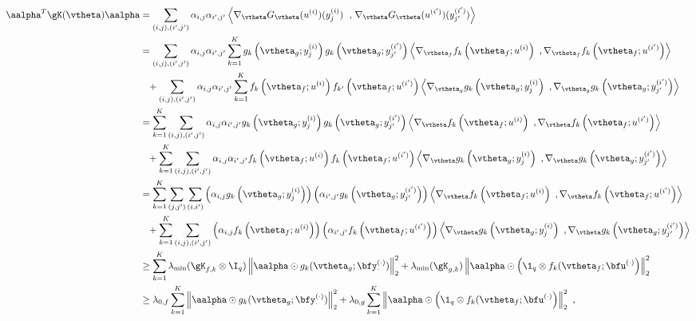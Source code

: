 \begin{align*}
\aalpha^T \gK(\vtheta) \aalpha &= \sum_{(i,j), (i',j')} \alpha_{i,j} \alpha_{i',j'} \left\langle  \nabla_{\vtheta}
G_{\vtheta}(u^{(i)})(y^{(i)}_j) \right. ~,  \left.  \nabla_{\vtheta} G_{\vtheta}(u^{(i')})(y^{(i')}_{j'})  \right\rangle \\
& = \sum_{(i,j), (i',j')} \alpha_{i,j} \alpha_{i',j'} 
\sum_{k=1}^K g_k\left(\vtheta_g; y^{(i)}_j\right) g_{k}\left(\vtheta_g; y^{(i')}_{j'} \right) \left\langle \nabla_{\vtheta_f} f_k \left(\vtheta_f; u^{(i)}\right)~,  \nabla_{\vtheta_f} f_{k} \left(\vtheta_f; u^{(i')}\right) \right\rangle \\
& \phantom{=} + \sum_{(i,j), (i',j')} \alpha_{i,j} \alpha_{i',j'} 
\sum_{k=1}^K f_k \left(\vtheta_f; u^{(i)}\right) f_{k'} \left(\vtheta_f; u^{(i')}\right) \left\langle \nabla_
{\vtheta_g} g_k\left(\vtheta_g; y^{(i)}_j\right)~, \nabla_{\vtheta_g} g_{k}\left(\vtheta_g; y^{(i')}_{j'}\right) \right\rangle \\
& = \sum_{k=1}^K \sum_{(i,j), (i',j')} \alpha_{i,j} \alpha_{i',j'} 
 g_k\left(\vtheta_g; y^{(i)}_j\right) g_{k}\left(\vtheta_g; y^{(i')}_{j'} \right) \left\langle \nabla_{\vtheta} f_k \left(\vtheta_f; u^{(i)}\right)~,  \nabla_{\vtheta} f_{k} \left(\vtheta_f; u^{(i')}\right) \right\rangle \\
& \phantom{=} + \sum_{k=1}^K  \sum_{(i,j), (i',j')} \alpha_{i,j} \alpha_{i',j'} 
f_k \left(\vtheta_f; u^{(i)}\right) f_{k} \left(\vtheta_f; u^{(i')}\right) \left\langle \nabla_{\vtheta} g_k\left(\vtheta_g; y^{(i)}_j\right)~, \nabla_{\vtheta} g_{k}\left(\vtheta_g; y^{(i')}_{j'}\right) \right\rangle \\
& = \sum_{k=1}^K   \sum_{(j,j')} \sum_{(i,i')}  \left( \alpha_{i,j} g_k\left(\vtheta_g; y^{(i)}_j\right) \right) \left( \alpha_{i',j'} g_{k}\left(\vtheta_g; y^{(i')}_{j'} \right)  \right) \left\langle   \nabla_{\vtheta} f_k \left(\vtheta_f; u^{(i)}\right)~,  \nabla_{\vtheta} f_{k} \left(\vtheta_f; u^{(i')}\right) \right\rangle \\
 & \phantom{=} + \sum_{k=1}^K \sum_{(i,j), (i',j')} \left(\alpha_{i,j} f_k \left(\vtheta_f; u^{(i)}\right)\right) \left( \alpha_{i',j'} f_{k} \left(\vtheta_f; u^{(i')}\right) \right) \left\langle  \nabla_{\vtheta} g_k\left(\vtheta_g; y^{(i)}_j\right)~,  \nabla_{\vtheta} g_{k}\left(\vtheta_g; y^{(i')}_{j'}\right) \right\rangle \\
 & \geq \sum_{k=1}^K \lambda_{\min}( \gK_{f,k} \otimes \I_q) \left\| \aalpha \odot g_k(\vtheta_g; \bfy^{(\cdot)}_{\cdot}) \right\|_2^2 + \lambda_{\min}( \gK_{g,k}) \left\| \aalpha \odot \left(\1_q \otimes f_k(\vtheta_f; \bfu^{(\cdot)} \right) \right\|_2^2 \\
 & \geq  \lambda_{0,f} \sum_{k=1}^K \left\| \aalpha \odot g_k(\vtheta_g; \bfy^{(\cdot)}_{\cdot}) \right\|_2^2  + \lambda_{0,g} \sum_{k=1}^K \left\| \aalpha \odot \left(\1_q \otimes f_k(\vtheta_f; \bfu^{(\cdot)} \right) \right\|_2^2 ~,
\end{align*}
